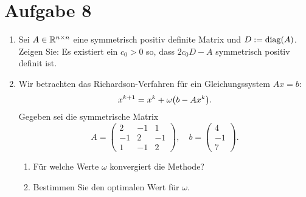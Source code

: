 \documentclass{exercise}
\begin{document}
    \section*{Aufgabe 8}
    
    \begin{problem}
        \begin{enumerate}
            \item Sei \(A \in \mathbb{R}^{n \times n}\) eine symmetrisch positiv definite Matrix und \(D := \diag\parentheses*{A}\).
            Zeigen Sie: Es existiert ein \(c_0 > 0\) so, dass \(2c_0 D - A\) symmetrisch positiv definit ist.
            \item Wir betrachten das Richardson-Verfahren für ein Gleichungssystem \(Ax = b\):
            \[
                x^{k + 1} = x^k + \omega\parentheses*{b - Ax^k}.
            \]
            Gegeben sei die symmetrische Matrix
            \[
                A = \begin{pmatrix}
                    2 & -1 & 1\\
                    -1 & 2 & -1\\
                    1 & -1 & 2
                \end{pmatrix}, \quad b = \begin{pmatrix}
                    4\\
                    -1\\
                    7
                \end{pmatrix}.
            \]
            \begin{enumerate}
                \item Für welche Werte \(\omega\) konvergiert die Methode?
                \item Bestimmen Sie den optimalen Wert für \(\omega\).
            \end{enumerate}
        \end{enumerate}
    \end{problem}
    
\end{document}
